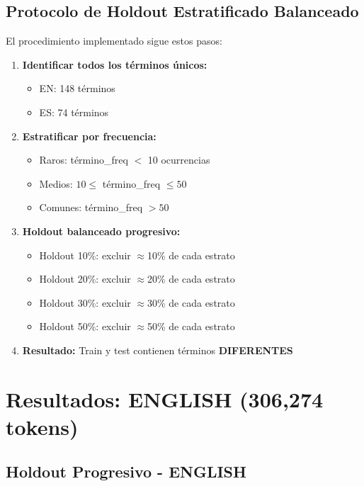 \subsection{Protocolo de Holdout Estratificado Balanceado}

El procedimiento implementado sigue estos pasos:

\begin{enumerate}
    \item \textbf{Identificar todos los términos únicos:}
    \begin{itemize}
        \item EN: 148 términos
        \item ES: 74 términos
    \end{itemize}

    \item \textbf{Estratificar por frecuencia:}
    \begin{itemize}
        \item Raros: término\_freq $<$ 10 ocurrencias
        \item Medios: $10 \leq$ término\_freq $\leq 50$
        \item Comunes: término\_freq $> 50$
    \end{itemize}

    \item \textbf{Holdout balanceado progresivo:}
    \begin{itemize}
        \item Holdout 10\%: excluir $\approx$10\% de cada estrato
        \item Holdout 20\%: excluir $\approx$20\% de cada estrato
        \item Holdout 30\%: excluir $\approx$30\% de cada estrato
        \item Holdout 50\%: excluir $\approx$50\% de cada estrato
    \end{itemize}

    \item \textbf{Resultado:} Train y test contienen términos \textbf{DIFERENTES}
\end{enumerate}

\section{Resultados: ENGLISH (306,274 tokens)}

\subsection{Holdout Progresivo - ENGLISH}

